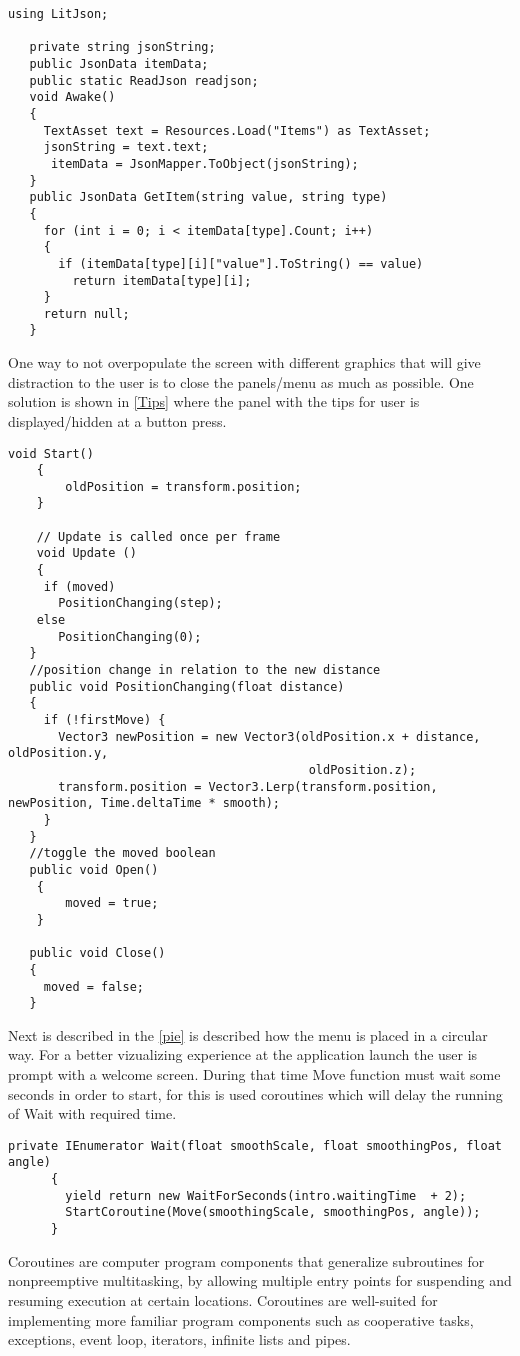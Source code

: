 {  
 \begin{lstlisting}[caption={Reading JSON from a file.},label={readJsonCode}]
 using LitJson;

   private string jsonString;
   public JsonData itemData;
   public static ReadJson readjson;
   void Awake()
   {
     TextAsset text = Resources.Load("Items") as TextAsset;
     jsonString = text.text;
      itemData = JsonMapper.ToObject(jsonString);
   }
   public JsonData GetItem(string value, string type) 
   {
     for (int i = 0; i < itemData[type].Count; i++)
     {
       if (itemData[type][i]["value"].ToString() == value)
         return itemData[type][i];
     }
     return null;
   }
 \end{lstlisting}
 
 
One way to not overpopulate the screen with different graphics that will give distraction to the user is to close the panels/menu as much as possible. One solution is shown in \autoref{Tips} where the panel with the tips for user is displayed/hidden at a button press.
 \begin{lstlisting}[caption={Moving tips panel},label={Tips}]
   void Start()
 	{
 		oldPosition = transform.position;
 	}
 	
 	// Update is called once per frame
 	void Update ()                                                 
 	{
     if (moved)
       PositionChanging(step);
    else
       PositionChanging(0);
   }
   //position change in relation to the new distance
   public void PositionChanging(float distance)
   {
     if (!firstMove) { 
       Vector3 newPosition = new Vector3(oldPosition.x + distance, oldPosition.y,
                                          oldPosition.z);
       transform.position = Vector3.Lerp(transform.position, newPosition, Time.deltaTime * smooth);
     }
   }
   //toggle the moved boolean
   public void Open()
 	{
 		moved = true;
 	}
 
   public void Close()
   {
     moved = false;
   }
 \end{lstlisting}

 Next is described in the \autoref{pie} is described how the menu is placed in a circular way. For a better vizualizing experience at the application launch the user is prompt with a welcome screen. During that time Move function must wait some seconds in order to start, for this is used coroutines which will delay the running of Wait with required time.
  
    \begin{lstlisting}[caption={Coroutines},label={pie}]
      private IEnumerator Wait(float smoothScale, float smoothingPos, float angle)
      {
        yield return new WaitForSeconds(intro.waitingTime  + 2);
        StartCoroutine(Move(smoothingScale, smoothingPos, angle));
      }
    \end{lstlisting}
 Coroutines are computer program components that generalize subroutines for nonpreemptive multitasking, by allowing multiple entry points for suspending and resuming execution at certain locations. Coroutines are well-suited for implementing more familiar program components such as cooperative tasks, exceptions, event loop, iterators, infinite lists and pipes. 
 
}
